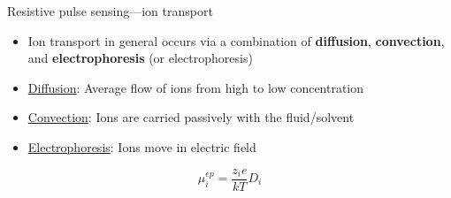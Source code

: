 \begin{frame}[c]{Resistive pulse sensing---ion transport}	
	\begin{itemize}
		\item Ion transport in general occurs via a combination of \textbf{diffusion}, \textbf{convection}, and \textbf{electrophoresis} (or electrophoresis)
		\item \underline{Diffusion}: Average flow of ions from high to low concentration
		\item \underline{Convection}: Ions are carried passively with the fluid/solvent
		\item \underline{Electrophoresis}: Ions move in electric field
	\end{itemize}
	\begin{equation} \tag{Einstein-Smoluchowski relation} 
		\mu^{ep}_{i}=\frac{z_{i}e}{kT}D_{i}
	\end{equation}

	


\end{frame}



